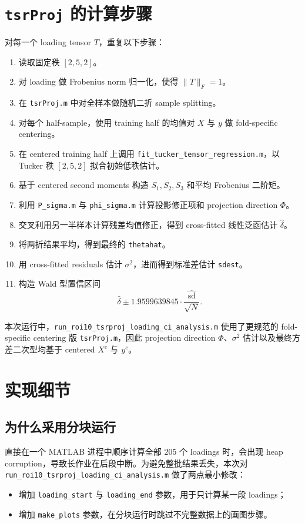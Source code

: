 \documentclass[11pt]{ctexart}
\begin{document}
\section{\texttt{tsrProj} 的计算步骤}
对每一个 loading tensor $T$，重复以下步骤：
\begin{enumerate}
\item 读取固定秩 $[2,5,2]$。
\item 对 loading 做 Frobenius norm 归一化，使得 $\|T\|_F=1$。
\item 在 \texttt{tsrProj.m} 中对全样本做随机二折 sample splitting。
\item 对每个 half-sample，使用 training half 的均值对 $X$ 与 $y$ 做 fold-specific centering。
\item 在 centered training half 上调用 \texttt{fit\_tucker\_tensor\_regression.m}，以 Tucker 秩 $[2,5,2]$ 拟合初始低秩估计。
\item 基于 centered second moments 构造 $S_1,S_2,S_3$ 和平均 Frobenius 二阶矩。
\item 利用 \texttt{P\_sigma.m} 与 \texttt{phi\_sigma.m} 计算投影修正项和 projection direction $\Phi$。
\item 交叉利用另一半样本计算残差均值修正，得到 cross-fitted 线性泛函估计 $\hat\delta$。
\item 将两折结果平均，得到最终的 \texttt{thetahat}。
\item 用 cross-fitted residuals 估计 $\sigma^2$，进而得到标准差估计 \texttt{sdest}。
\item 构造 Wald 型置信区间
\[
\hat\delta \pm 1.9599639845 \cdot \frac{\widehat{\mathrm{sd}}}{\sqrt{N}}.
\]
\end{enumerate}

本次运行中，\texttt{run\_roi10\_tsrproj\_loading\_ci\_analysis.m} 使用了更规范的 fold-specific centering 版 \texttt{tsrProj.m}，因此 projection direction $\Phi$、$\sigma^2$ 估计以及最终方差二次型均基于 centered $X^c$ 与 $y^c$。

\section{实现细节}
\subsection{为什么采用分块运行}
直接在一个 MATLAB 进程中顺序计算全部 $205$ 个 loadings 时，会出现 heap corruption，导致长作业在后段中断。为避免整批结果丢失，本次对
\texttt{run\_roi10\_tsrproj\_loading\_ci\_analysis.m}
做了两点最小修改：
\begin{itemize}
\item 增加 \texttt{loading\_start} 与 \texttt{loading\_end} 参数，用于只计算某一段 loadings；
\item 增加 \texttt{make\_plots} 参数，在分块运行时跳过不完整数据上的画图步骤。
\end{itemize}
\end{document}
